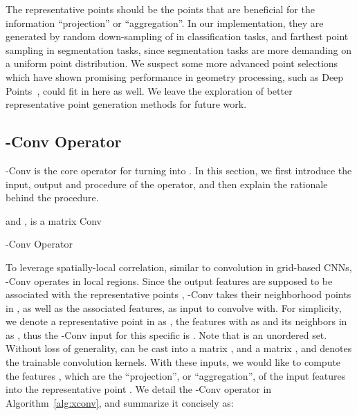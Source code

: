 \documentclass{article}
\begin{document}
The representative points  should be the points that are beneficial for the information ``projection'' or ``aggregation''. In our implementation, they are generated by random down-sampling of  in classification tasks, and farthest point sampling in segmentation tasks, since segmentation tasks are more demanding on a uniform point distribution. We suspect some more advanced point selections which have shown promising performance in geometry processing, such as Deep Points~\cite{Wu_SIGGRAPH15}, could fit in here as well. We leave the exploration of better representative point generation methods for future work.

\subsection{-Conv Operator}

-Conv is the core operator for turning  into . In this section, we first introduce the input, output and procedure of the operator, and then explain the rationale behind the procedure.

\begin{algorithm}[h!]
	\Input{, , , }
	\begin{algorithmic}[1]
		\State  {} 
		\State  {} 
		\State  {} and ,  is a  matrix 
		\State  {} 
		\State  {} 
		\State  Conv 	
	\end{algorithmic}
	\caption{-Conv Operator}
	\label{alg:xconv}
\end{algorithm}

To leverage spatially-local correlation, similar to convolution in grid-based CNNs, -Conv operates in local regions. Since the output features are supposed to be associated with the representative points , -Conv takes their neighborhood points in , as well as the associated features, as input to convolve with. For simplicity, we denote a representative point in  as , the features with  as  and its  neighbors in  as , thus the -Conv input for this specific  is . Note that  is an unordered set. Without loss of generality,  can be cast into a  matrix , and a  matrix , and  denotes the trainable convolution kernels. With these inputs, we would like to compute the features , which are the ``projection'', or ``aggregation'', of the input features into the representative point . We detail the -Conv operator in Algorithm~\ref{alg:xconv}, and summarize it concisely as:
\end{document}

